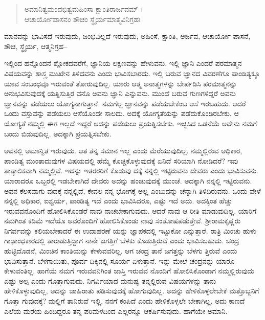 \begin{verse}
ಅಮಾನಿತ್ವಮಂದಭಿತ್ವಮಹಿಂಸಾ ಕ್ಷಾಂತಿರಾರ್ಜವಮ್ ।\\ಆಚಾರ್ಯೋಪಾಸನಂ ಶೌಚಂ ಸ್ಥೈರ್ಯಮಾತ್ಮವಿನಿಗ್ರಹಃ 
\end{verse}

{\small ಮಾನವನ್ನು ಭಾವಿಸದೆ ಇರುವುದು, ಜಂಭವಿಲ್ಲದೆ ಇರುವುದು, ಅಹಿಂಸೆ, ಕ್ಷಾಂತಿ, ಆರ್ಜವ, ಆಚಾರ್ಯೋ ಪಾಸನೆ, ಶೌಚ, ಸ್ಥೈರ್ಯ, ಆತ್ಮನಿಗ್ರಹ–}

ಇಲ್ಲಿಂದ ಹನ್ನೊಂದನೆ ಶ್ಲೋಕದವರೆಗೆ, ಜ್ಞಾನಿಯ ಲಕ್ಷಣವನ್ನು ಹೇಳುವನು. ಇಲ್ಲಿ ಜ್ಞಾನಿ ಎಂದರೆ ಪರಮಾತ್ಮನ ವಿಷಯವನ್ನು ಶಾಸ್ತ್ರ ಮುಖೇನ ತಿಳಿದವನು ಎಂದು ಭಾವಿಸಬಾರದು. ಇಲ್ಲಿ ಬರುವ ಜ್ಞಾನದ ವಿವರಣೆಗೂ ಪಾಂಡಿತ್ಯಕ್ಕೂ ಯಾವ ಸಂಬಂಧವೂ ಇರುವಂತೆ ತೋರುವುದಿಲ್ಲ. ಯಾರು ಆತ್ಮ ಅನಾತ್ಮಗಳನ್ನು ಬೇರ್ಪಡಿಸಿ ಪರಮಾತ್ಮನನ್ನು ಅನುಭವಿಸುವುದಕ್ಕೆ ಯತ್ನಿಸುತ್ತಿರ ವನೊ ಅವನು ಜ್ಞಾನಿ ಎನ್ನುವನು. ಮುಂದೆ ಬರುವ ಗುಣಗಳಿದ್ದರೆ ಅವನು ಜ್ಞಾನವನ್ನು ಪಡೆಯಲು ಯೋಗ್ಯನಾಗುತ್ತಾನೆ. ನಮಗೆಲ್ಲ ಜ್ಞಾನವನ್ನು ಪಡೆಯಬೇಕೆಂಬ ಆಸೆ ಇರಬಹುದು. ಆದರೆ ಒಂದು ವಸ್ತುವನ್ನು ಪಡೆಯಲು ಆಸೆಯೊಂದೇ ಸಾಲದು. ಅದಕ್ಕೆ ಯೋಗ್ಯತೆಯನ್ನು ಪಡೆದುಕೊಂಡಿರಬೇಕು. ಆ ಯೋಗ್ಯತೆ ನಮ್ಮಲ್ಲಿ ಈಗ ಇಲ್ಲದೆ ಇದ್ದರೆ ಅದನ್ನು ಪಡೆಯಲು ಪ್ರಯತ್ನಿಸಬೇಕು. ಇಚ್ಛಿಸಿದ ಒಡನೆಯೆ ಅವೇನು ನಮಗೆ ಬಂದು ಬಿಡುವುದಿಲ್ಲ. ಅದಕ್ಕಾಗಿ ಪ್ರಯತ್ನಿಸಬೇಕು.

ಅವನಲ್ಲಿ ಅಮಾನ್ವಿತ ಇರುವುದು. ಆತ ತನ್ನ ಸಮಾನ ಇಲ್ಲ ಎಂದು ಮೆರೆಯುವುದಿಲ್ಲ. ನಮ್ಮಲ್ಲಿರುವ ಅಧಿಕಾರ, ಪಾಂಡಿತ್ಯ ಮುಂತಾದುವುಗಳ ವಿಷಯದಲ್ಲಿ ಹೆಮ್ಮೆ ಕೊಚ್ಚಿಕೊಳ್ಳುವುದಕ್ಕೆ ಏನಿದೆ ಸರಿಯಾಗಿ ನೋಡಿದರೆ? ಇವು ತಾತ್ಕಾಲಿಕವಾಗಿ ನಮ್ಮಲ್ಲಿವೆ. ಇದನ್ನು ಇತರರರಿಗೆ ಕೊಡುವು ದಕ್ಕೆ ನನ್ನಲ್ಲಿ ಇಟ್ಟಿರುವನು ದೇವರು ಎಂದು ಭಾವಿಸುವನು. ಯಾರಾದರೂ ಒಬ್ಬರಲ್ಲಿ ಇಡಬೇಕಾಗಿದೆ ದೇವರು ಅದನ್ನು ಹಂಚುವುದಕ್ಕೆ ಮುಂಚೆ. ಅದಕ್ಕಾಗಿ ನನ್ನಲ್ಲಿ ಇಟ್ಟಿರುವನು. ಅವನ ಕೆಲಸವಾಗು ವುದಕ್ಕೆ ನನ್ನಲ್ಲಿದೆ, ಕೇವಲ ನನ್ನ ಭೋಗಕ್ಕೆ ಅಲ್ಲ ಎಂಬುದನ್ನು ಚೆನ್ನಾಗಿ ತಿಳಿದಿರುವನು. ಒಂದು ವೇಳೆ ನನ್ನಲ್ಲಿ ಅಧಿಕಾರ, ಐಶ್ವರ್ಯ, ಪಾಂಡಿತ್ಯ ಇದೆ ಎಂದು ಭಾವಿಸಿದರೂ, ಎಷ್ಟು ಇದೆ ಅದು. ಅದಕ್ಕಿಂತ ಹೆಚ್ಚು ಇರುವವನೊಂದಿಗೆ ಹೋಲಿಸಿಕೊಂಡರೆ ನಾವು ನಾಚಬೇಕಾಗುವುದು. ಆದರೆ ನಾವು ಆ ರೀತಿ ಮಾಡುವುದಿಲ್ಲ. ಯಾರಿಗೆ ನಮಗಿಂತ ಕಡಿಮೆ ಇದೆಯೊ ಅವರೊಂದಿಗೆ ಹೋಲಿಸಿಕೊಂಡು ನಾವು ಸಂತೋಷಪಡುತ್ತೇವೆ. ಶ್ರೀರಾಮಕೃಷ್ಣರು ನಿಗರ್ವವನ್ನು ಕಲಿಯಬೇಕಾದರೆ ಈ ಉದಾಹರಣೆ ಯನ್ನು ಜ್ಞಾಪಕದಲ್ಲಿ ಇಟ್ಟುಕೋ ಎನ್ನುತ್ತಾರೆ. ರಾತ್ರಿ ಮಿಂಚು ಹುಳು ಗಾಢಾಂಧಕಾರದಲ್ಲಿ ತಾರಾಡುತ್ತಿದ್ದಾಗ ನಾನೇ ಜಗತ್ತಿಗೆ ಬೆಳಕು ಕೊಡುತ್ತಿರುವೆ ಎಂದು ಭಾವಿಸಬಹುದು. ಚಂದ್ರ ಹುಟ್ಟಿದೊಡನೆ, ಮಿಂಚಿನ ಕಾಂತಿಯನ್ನು ಕೇಳುವವರಿಲ್ಲ. ಆಗ ಚಂದ್ರ ತಾನೆ ಜಗತ್ತನ್ನು ಬೆಳಗು ತ್ತಿರುವೆ ಎಂದು ಭಾವಿಸುತ್ತಾನೆ. ಬೆಳಗಾಯಿತು, ಪೂರ್ವ ದಿಕ್ಕಿನಲ್ಲಿ ಸೂರ್ಯ ಏಳುತ್ತಾನೆ. ಇನ್ನು ಮೇಲೆ ಚಂದ್ರನನ್ನು ಯಾರೂ ಕೇಳುವಂತಿಲ್ಲ. ಹಾಗೆಯೆ ನಮಗೆ ಇರುವವನಿಗಿಂತ ಜಾಸ್ತಿ ಇರುವವ ನೊಂದಿಗೆ ಹೋಲಿಸಿಕೊಂಡಾಗ ನಮ್ಮಲ್ಲಿರುವುದು ಎಷ್ಟು ಅಲ್ಪ ಎಂದು ಗೊತ್ತಾಗುವುದು. ನಿಗರ್ವಿಯಾದ ಮನುಷ್ಯ ತನ್ನಲ್ಲಿರುವ ವಿಷಯಗಳನ್ನು ತಾನು ಹೇಳಿಕೊಳ್ಳುವುದಿಲ್ಲ, ಅದನ್ನು ಜಾಹಿರಾತು ಪಡಿಸುವುದಕ್ಕೆ ಹೋಗುವುದಿಲ್ಲ. ಅದನ್ನು ಹೇಳಿಕೊಳ್ಳಲೇಬೇಕೆ ಮತ್ತೊಬ್ಬನಿಗೆ ಗೊತ್ತಾ ಗುವುದಕ್ಕೆ? ಮಲ್ಲಿಗೆ ತಾನಿರುವೆ ಇಲ್ಲಿ, ನನಗೆ ಕಂಪಿದೆ ಎಂದು ಹೇಳಿಕೊಳ್ಳಲೇ ಬೇಕಾಗಿಲ್ಲ. ಅದು ಕಾಣದೆ ಎಲೆಯ ಮರೆಯ ಹಿಂದಿದ್ದರೂ ತನ್ನ ಪರಿಮಳದಿಂದ ಎಲ್ಲರನ್ನೂ ಆಕರ್ಷಿಸುವುದು. ಹಾಗೆಯೇ ಅಮಾನಿ.

